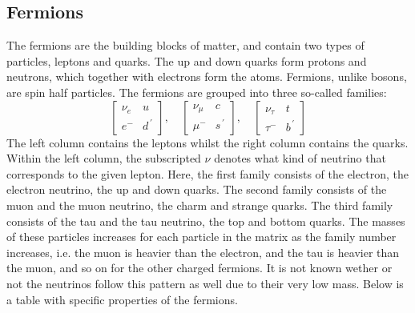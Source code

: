\subsection*{Fermions}
The fermions are the building blocks of matter, and contain two types of particles, leptons and quarks. The up and down quarks form protons and neutrons, which together with electrons form the atoms.
Fermions, unlike bosons, are spin half particles. The fermions are grouped into three so-called families:
\begin{equation*}
    \begin{bmatrix}
        \nu_e & u \\
        e^{-} & d^{\, '} 
    \end{bmatrix},\quad
    \begin{bmatrix}
        \nu_{\mu} & c \\
        \mu^{-} & s^{\, '}
    \end{bmatrix},\quad
    \begin{bmatrix}
        \nu_{\tau} & t \\
        \tau^{-} & b^{\, '}
    \end{bmatrix}
\end{equation*}
The left column contains the leptons whilst the right column contains the quarks. Within the left column, the subscripted $\nu$ denotes what kind of neutrino that corresponds 
to the given lepton. Here, the first family consists of the electron, the electron neutrino, the up and down quarks. The second family consists of the muon and the
muon neutrino, the charm and strange quarks. The third family consists of the tau and the tau neutrino, the top and bottom quarks. The masses of these particles 
increases for each particle in the matrix as the family number increases, i.e. the muon is heavier than the electron, and the tau is heavier than the muon, and so 
on for the other charged fermions. It is not known wether or not the neutrinos follow this pattern as well due to their very low mass. Below is a table with specific properties of the fermions.\par

